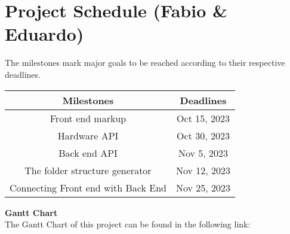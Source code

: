  \section{Project Schedule (Fabio \& Eduardo)}
 The milestones mark major goals to be reached according to their respective deadlines.
\begin{table}[H]
    \centering
    \begin{tabular}{||c | c||} 
        \hline
        Milestones & Deadlines\\
        \hline
        Front end markup & Oct 15, 2023\\
        \hline
        Hardware API & Oct 30, 2023\\
        \hline
        Back end API & Nov 5, 2023\\
        \hline
        The folder structure generator & Nov 12, 2023\\
        \hline
        Connecting Front end with Back End & Nov 25, 2023\\
        \hline
    \end{tabular}
\end{table}
\textbf{Gantt Chart}\\
The Gantt Chart of this project can be found in the following link: